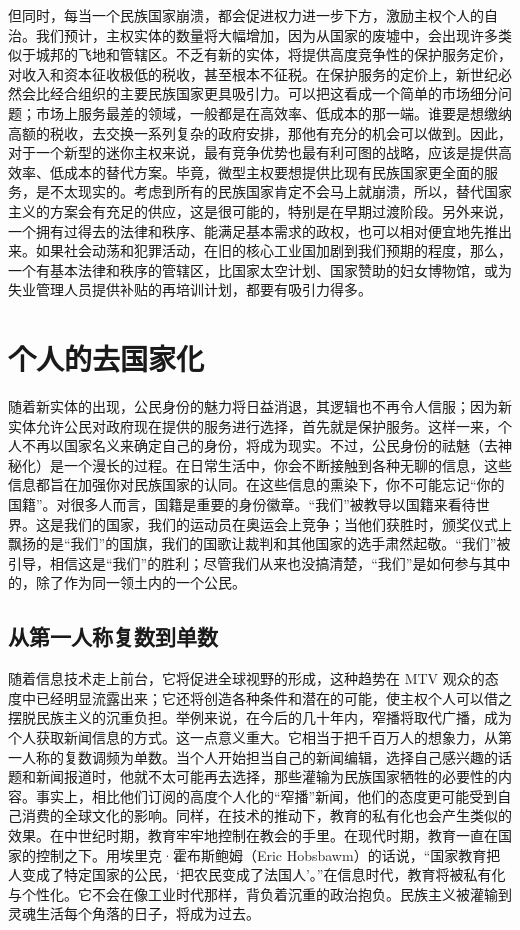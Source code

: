 但同时，每当一个民族国家崩溃，都会促进权力进一步下方，激励主权个人的自治。我们预计，主权实体的数量将大幅增加，因为从国家的废墟中，会出现许多类似于城邦的飞地和管辖区。不乏有新的实体，将提供高度竞争性的保护服务定价，对收入和资本征收极低的税收，甚至根本不征税。在保护服务的定价上，新世纪必然会比经合组织的主要民族国家更具吸引力。可以把这看成一个简单的市场细分问题；市场上服务最差的领域，一般都是在高效率、低成本的那一端。谁要是想缴纳高额的税收，去交换一系列复杂的政府安排，那他有充分的机会可以做到。因此，对于一个新型的迷你主权来说，最有竞争优势也最有利可图的战略，应该是提供高效率、低成本的替代方案。毕竟，微型主权要想提供比现有民族国家更全面的服务，是不太现实的。考虑到所有的民族国家肯定不会马上就崩溃，所以，替代国家主义的方案会有充足的供应，这是很可能的，特别是在早期过渡阶段。另外来说，一个拥有过得去的法律和秩序、能满足基本需求的政权，也可以相对便宜地先推出来。如果社会动荡和犯罪活动，在旧的核心工业国加剧到我们预期的程度，那么，一个有基本法律和秩序的管辖区，比国家太空计划、国家赞助的妇女博物馆，或为失业管理人员提供补贴的再培训计划，都要有吸引力得多。

\section{个人的去国家化}
随着新实体的出现，公民身份的魅力将日益消退，其逻辑也不再令人信服；因为新实体允许公民对政府现在提供的服务进行选择，首先就是保护服务。这样一来，个人不再以国家名义来确定自己的身份，将成为现实。不过，公民身份的祛魅（去神秘化）是一个漫长的过程。在日常生活中，你会不断接触到各种无聊的信息，这些信息都旨在加强你对民族国家的认同。在这些信息的熏染下，你不可能忘记“你的国籍”。对很多人而言，国籍是重要的身份徽章。“我们”被教导以国籍来看待世界。这是我们的国家，我们的运动员在奥运会上竞争；当他们获胜时，颁奖仪式上飘扬的是“我们”的国旗，我们的国歌让裁判和其他国家的选手肃然起敬。“我们”被引导，相信这是“我们”的胜利；尽管我们从来也没搞清楚，“我们”是如何参与其中的，除了作为同一领土内的一个公民。

\subsection{从第一人称复数到单数}

随着信息技术走上前台，它将促进全球视野的形成，这种趋势在 MTV 观众的态度中已经明显流露出来；它还将创造各种条件和潜在的可能，使主权个人可以借之摆脱民族主义的沉重负担。举例来说，在今后的几十年内，窄播将取代广播，成为个人获取新闻信息的方式。这一点意义重大。它相当于把千百万人的想象力，从第一人称的复数调频为单数。当个人开始担当自己的新闻编辑，选择自己感兴趣的话题和新闻报道时，他就不太可能再去选择，那些灌输为民族国家牺牲的必要性的内容。事实上，相比他们订阅的高度个人化的“窄播”新闻，他们的态度更可能受到自己消费的全球文化的影响。同样，在技术的推动下，教育的私有化也会产生类似的效果。在中世纪时期，教育牢牢地控制在教会的手里。在现代时期，教育一直在国家的控制之下。用埃里克·霍布斯鲍姆（Eric Hobsbawm）的话说，“国家教育把人变成了特定国家的公民，‘把农民变成了法国人’。”在信息时代，教育将被私有化与个性化。它不会在像工业时代那样，背负着沉重的政治抱负。民族主义被灌输到灵魂生活每个角落的日子，将成为过去。


